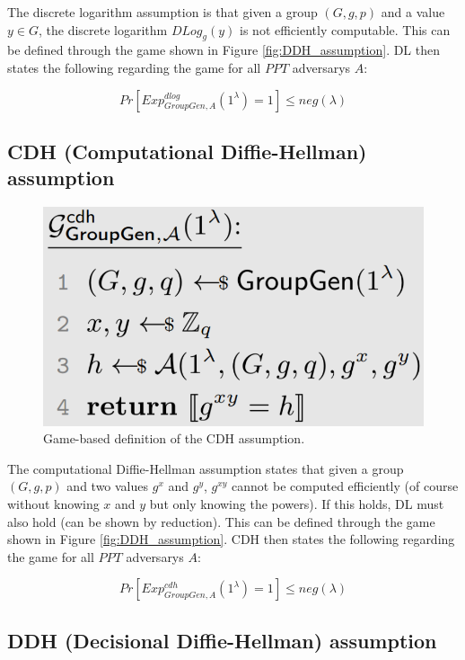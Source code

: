 The discrete logarithm assumption is that given a group $(G,g,p)$ and a value $y \in G$, the discrete logarithm $DLog_g(y)$ is not efficiently computable.
This can be defined through the game shown in Figure \ref{fig:DDH_assumption}.
DL then states the following regarding the game for all $PPT$ adversarys $A$:

$$
    Pr[Exp_{GroupGen,A}^{dlog}(1^\lambda) = 1] \leq neg(\lambda)
$$


\subsection{CDH (Computational Diffie-Hellman) assumption}

\begin{figure}
    \center
    \includegraphics[width=\linewidth]{gfx/CDH_assumption.png}
    \caption{Game-based definition of the CDH assumption.}
    \label{fig:CDH_assumption}
\end{figure}


The computational Diffie-Hellman assumption states that given a group $(G,g,p)$ and two values $g^x$ and $g^y$, $g^{xy}$ cannot be computed efficiently (of course without knowing $x$ and $y$ but only knowing the powers).
If this holds, DL must also hold (can be shown by reduction).
This can be defined through the game shown in Figure \ref{fig:DDH_assumption}.
CDH then states the following regarding the game for all $PPT$ adversarys $A$:

$$
    Pr[Exp_{GroupGen,A}^{cdh}(1^\lambda) = 1] \leq neg(\lambda)
$$


\subsection{DDH (Decisional Diffie-Hellman) assumption}


